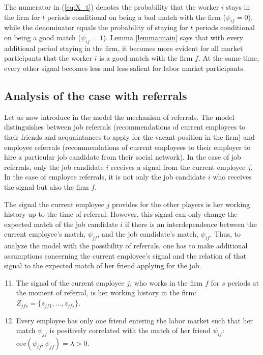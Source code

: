 \documentclass[12pt]{article}
\begin{document}
The numerator in (\ref{eq:X_t}) denotes the probability that the worker $i$  stays in the firm for $t$ periods conditional on being a bad match with the firm ($\psi_{if}=0$), while the denominator equals the probability of staying for $t$ periods conditional on being a good match ($\psi_{if}=1$). Lemma \ref{lemma:main} says that with every additional period staying in the firm, it becomes more evident for all market participants that the worker $i$ is a good match with the firm $f$. At the same time, every other signal becomes less and less salient for labor market participants.

\subsection{Analysis of the case with referrals}

Let us now introduce in the model the mechanism of referrals. The model distinguishes between job referrals (recommendations of current employees to their friends and acquaintances to apply for the vacant position in the firm) and employee referrals (recommendations of current employees to their employer to hire a particular job candidate from their social network). In the case of job referrals, only the job candidate $i$ receives a signal from the current employee $j$. In the case of employee referrals, it is not only the job candidate $i$ who receives the signal but also the firm $f$. 

The signal the current employee $j$ provides for the other players is her working history up to the time of referral. However, this signal can only change the expected match of the job candidate $i$ if there is an interdependence between the current employee's match, $\psi_{jf}$, and the job candidate's match, $\psi_{if}$. Thus, to analyze the model with the possibility of referrals, one has to make additional assumptions concerning the current employee's signal and the relation of that signal to the expected match of her friend applying for the job.

\begin{enumerate}[label={A}{\arabic*}.]
\setcounter{enumi}{10}
\item The signal of the current employee $j$, who works in the firm $f$ for $s$ periods at the moment of referral, is her working history in the firm: $Z_{jfs}=\lbrace z_{jf1},...,z_{jfs}\rbrace$.
\item Every employee has only one friend entering the labor market such that her match $\psi_{jf}$ is positively correlated with the match of her friend $\psi_{if}$: $cov(\psi_{if},\psi_{jf})=\lambda >0$.
\end{enumerate}
\end{document}
